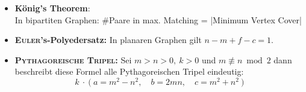 \begin{itemize}

	

	\item \textbf{König's Theorem}:\\
	In bipartiten Graphen: \#Paare in max. Matching = |Minimum Vertex Cover|
	
	\item \textbf{\textsc{Euler}'s-Polyedersatz:}
	In planaren Graphen gilt $n-m+f-c=1$.
	
	\item \textbf{\textsc{Pythagoreische Tripel}:}
	Sei $m>n>0,~k>0$ und $m\not\equiv n \bmod 2$ dann beschreibt diese Formel alle Pythagoreischen Tripel eindeutig:
	\[k~\cdot~\Big(~a=m^2-n^2,\quad b=2mn,\quad c=m^2+n^2~\Big)\]
	

\end{itemize}
